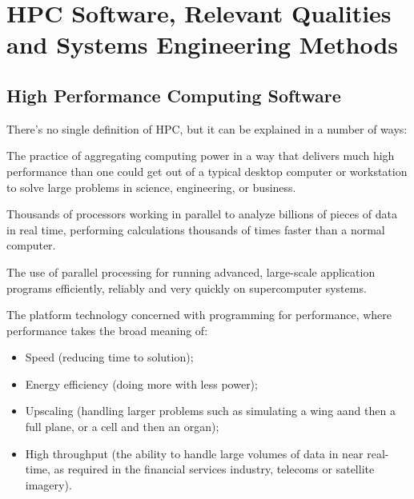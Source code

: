 \section{HPC Software, Relevant Qualities and Systems Engineering Methods}

\subsection{High Performance Computing Software}

There's no single definition of HPC, but it can be explained in a number of ways:
\begin{definitionbox}
    The practice of aggregating computing power in a way that delivers much high performance than one could get out of a typical desktop computer or workstation to solve large problems in science, engineering, or business.

    \highspace
    Thousands of processors working in parallel to analyze billions of pieces of data in real time, performing calculations thousands of times faster than a normal computer.

    \highspace
    The use of parallel processing for running advanced, large-scale application programs efficiently, reliably and very quickly on supercomputer systems.

    \highspace
    The platform technology concerned with programming for performance, where performance takes the broad meaning of:
    \begin{itemize}
        \item Speed (reducing time to solution);
        \item Energy efficiency (doing more with less power);
        \item Upscaling (handling larger problems such as simulating a wing aand then a full plane, or a cell and then an organ);
        \item High throughput (the ability to handle large volumes of data in near real-time, as required in the financial services industry, telecoms or satellite imagery).
    \end{itemize}
\end{definitionbox}

